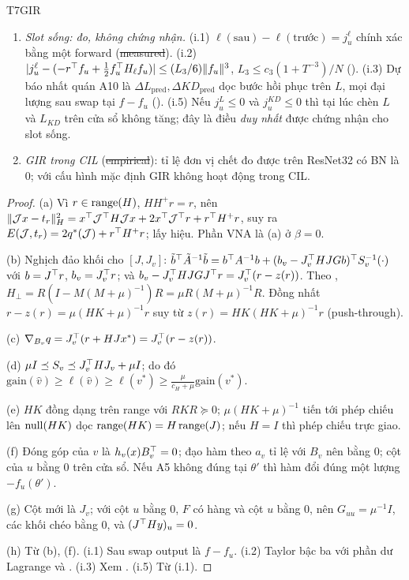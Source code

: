\begin{namedthm}{T7}{GIR}
\begin{enumerate}[label=(\alph*)]
\item \emph{Slot sống: đo, không chứng nhận.} (i.1) $\ell(\text{sau})-\ell(\text{trước})=j_u^\ell$ chính xác bằng một forward (\st{measured}). (i.2) $|j_u^\ell-(-r^{\top} f_u+\tfrac12f_u^{\top} H_\ell f_u)|\le(L_3/6)\lVert f_u\rVert^3$, $L_3\le c_3(1+T^{-3})/N$ (). (i.3) Dự báo nhất quán A10 là $\Delta L_{\mathrm{pred}},\Delta KD_{\mathrm{pred}}$ dọc bước hồi phục trên $L$, mọi đại lượng sau swap tại $f-f_u$ (). (i.5) Nếu $j_u^L\le0$ và $j_u^{KD}\le0$ thì tại lúc chèn $L$ và $L_{KD}$ trên cửa sổ không tăng; đây là điều \emph{duy nhất} được chứng nhận cho slot sống.
\item \emph{GIR trong CIL} (\st{empirical}): tỉ lệ đơn vị chết đo được trên ResNet32 có BN là $0$; với cấu hình mặc định GIR không hoạt động trong CIL.
\end{enumerate}
\end{namedthm}
\begin{proof}
(a) Vì $r\in\operatorname{range}(H)$, $HH^+r=r$, nên $\lVert \mathcal{J} x-t_r\rVert_H^2=x^{\top}\mathcal{J}^{\top} H\mathcal{J} x+2x^{\top}\mathcal{J}^{\top} r+r^{\top} H^+r$, suy ra $E(\mathcal{J},t_r)=2q^*(\mathcal{J})+r^{\top} H^+r$; lấy hiệu. Phần VNA là (a) ở $\beta=0$.

(b) Nghịch đảo khối cho $[J,J_v]$: $\tilde b^{\top}\tilde A^{-1}\tilde b=b^{\top} A^{-1}b+(b_v-J_v^{\top} HJGb)^{\top} S_v^{-1}(\cdot)$ với $b=J^{\top} r$, $b_v=J_v^{\top} r$; và $b_v-J_v^{\top} HJGJ^{\top} r=J_v^{\top}(r-z(r))$. Theo , $H_\perp=R(I-M(M+\mu)^{-1})R=\mu R(M+\mu)^{-1}R$. Đồng nhất $r-z(r)=\mu(HK+\mu)^{-1}r$ suy từ $z(r)=HK(HK+\mu)^{-1}r$ (push-through).

(c) $\nabla_{B_v}q=J_v^{\top}(r+HJx^*)=J_v^{\top}(r-z(r))$.

(d) $\mu I\preceq S_v\preceq J_v^{\top} HJ_v+\mu I$; do đó $\mathrm{gain}(\hat v)\ge\ell(\hat v)\ge\ell(v^*)\ge\frac{\mu}{c_H+\mu}\mathrm{gain}(v^*)$.

(e) $HK$ đồng dạng trên range với $RKR\succeq0$; $\mu(HK+\mu)^{-1}$ tiến tới phép chiếu lên $\operatorname{null}(HK)$ dọc $\operatorname{range}(HK)=H\operatorname{range}(J)$; nếu $H=I$ thì phép chiếu trực giao.

(f) Đóng góp của $v$ là $h_v(x)B_v^{\top}=0$; đạo hàm theo $a_v$ tỉ lệ với $B_v$ nên bằng $0$; cột của $u$ bằng $0$ trên cửa sổ. Nếu A5 không đúng tại $\theta'$ thì hàm đổi đúng một lượng $-f_u(\theta')$.

(g) Cột mới là $J_v$; với cột $u$ bằng $0$, $F$ có hàng và cột $u$ bằng $0$, nên $G_{uu}=\mu^{-1}I$, các khối chéo bằng $0$, và $(J^{\top} Hy)_u=0$.

(h) Từ (b), (f). (i.1) Sau swap output là $f-f_u$. (i.2) Taylor bậc ba với phần dư Lagrange và . (i.3) Xem . (i.5) Từ (i.1).
\end{proof}
